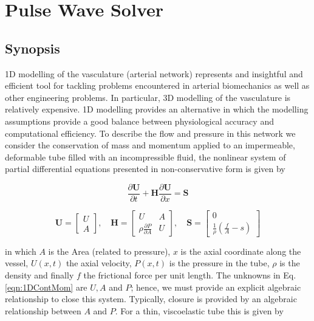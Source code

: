 \chapter{Pulse Wave Solver}

\section{Synopsis}

1D modelling of the vasculature (arterial network) represents and insightful and efficient tool for tackling problems encountered in arterial biomechanics as well as other engineering problems. In particular, 3D modelling of the vasculature is relatively expensive. 1D modelling provides an alternative in which the modelling assumptions provide a good balance between physiological accuracy and computational efficiency. To describe the flow and pressure in this network we consider the conservation of mass and momentum applied to an impermeable, deformable tube filled with an incompressible fluid, the nonlinear system of partial differential equations presented in non-conservative form is given by

\begin{equation}
\label{eqn:1DContMom}
\frac{\partial \mathbf{U}}{\partial{t}} + \mathbf{H}\frac{\partial{\mathbf{U}}}{\partial{x}}
= \mathbf{S}
\end{equation}

\begin{equation}
\mathbf{U}=\begin{bmatrix} U \\ A \end{bmatrix}, \quad \mathbf{H}=\begin{bmatrix} U & A \\ \rho\frac{\partial{P}}{\partial{A}} & U\end{bmatrix}, \quad \mathbf{S}=\begin{bmatrix} 0 \\ \frac{1}{\rho}\left(\frac{f}{A}-s\right) \end{bmatrix} \nonumber
\end{equation}

in which $A$ is the Area (related to pressure), $x$ is the axial coordinate along the vessel, $U(x,t)$ the axial velocity, $P(x,t)$ is the pressure in the tube,  $\rho$ is the density and finally $f$ the frictional force per unit length. The unknowns in Eq. \ref{eqn:1DContMom} are $U, A$ and $P$; hence, we must provide an explicit algebraic relationship to close this system. Typically, closure is provided by an algebraic relationship between $A$ and $P$. For a thin, viscoelastic tube this is given by

